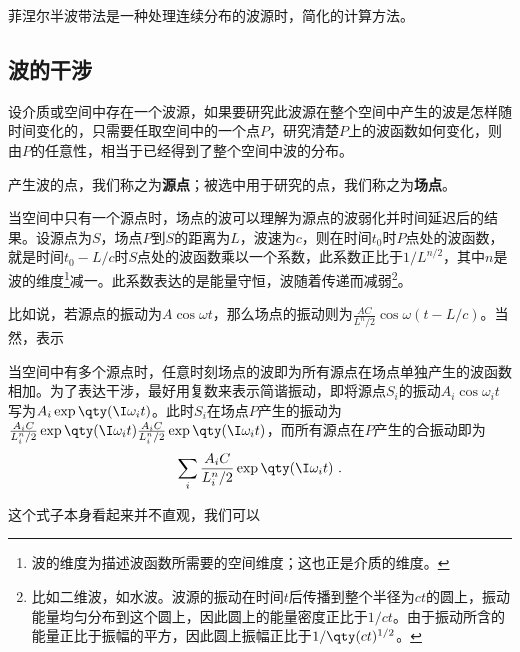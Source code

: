 



菲涅尔半波带法是一种处理连续分布的波源时，简化的计算方法。



\subsection{波的干涉}


设介质或空间中存在一个波源，如果要研究此波源在整个空间中产生的波是怎样随时间变化的，只需要任取空间中的一个点$P$，研究清楚$P$上的波函数如何变化，则由$P$的任意性，相当于已经得到了整个空间中波的分布。

产生波的点，我们称之为\textbf{源点}；被选中用于研究的点，我们称之为\textbf{场点}。

当空间中只有一个源点时，场点的波可以理解为源点的波弱化并时间延迟后的结果。设源点为$S$，场点$P$到$S$的距离为$L$，波速为$c$，则在时间$t_0$时$P$点处的波函数，就是时间$t_0-L/c$时$S$点处的波函数乘以一个系数，此系数正比于$1/L^{n/2}$，其中$n$是波的维度\footnote{波的维度为描述波函数所需要的空间维度；这也正是介质的维度。}减一。此系数表达的是能量守恒，波随着传递而减弱\footnote{比如二维波，如水波。波源的振动在时间$t$后传播到整个半径为$ct$的圆上，振动能量均匀分布到这个圆上，因此圆上的能量密度正比于$1/ct$。由于振动所含的能量正比于振幅的平方，因此圆上振幅正比于$1/\qty(ct)^{1/2}$。}。

比如说，若源点的振动为$A\cos \omega t$，那么场点的振动则为$\frac{AC}{L^n/2}\cos \omega(t-L/c)$。当然，表示

当空间中有多个源点时，任意时刻场点的波即为所有源点在场点单独产生的波函数相加。为了表达干涉，最好用复数来表示简谐振动，即将源点$S_i$的振动$A_i\cos\omega_it$写为$A_i\exp\qty(\I\omega_it)$。此时$S_i$在场点$P$产生的振动为$\frac{A_iC}{L_i^n/2}\exp\qty(\I\omega_it)\frac{A_iC}{L_i^n/2}\exp\qty(\I\omega_it)$，而所有源点在$P$产生的合振动即为
\begin{equation}
\sum_i \frac{A_iC}{L_i^n/2}\exp\qty(\I\omega_it)~. 
\end{equation}

这个式子本身看起来并不直观，我们可以























